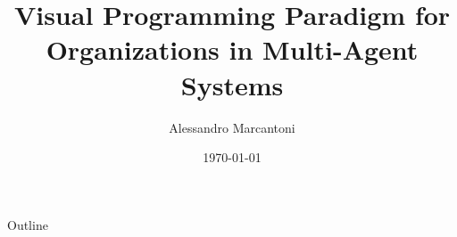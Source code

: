 \documentclass[11pt]{beamer}
\author{Alessandro Marcantoni}
\title{Visual Programming Paradigm for Organizations in Multi-Agent Systems}
\institute[]{Alma Mater Studiorum\\Università di Bologna}
\date{\today}
\begin{document}
\begin{frame}
    \titlepage
\end{frame}

\begin{frame}{Outline}
    \tableofcontents
\end{frame}


\end{document}
